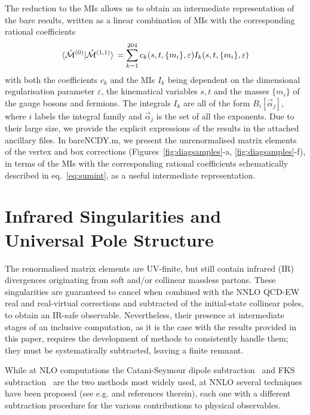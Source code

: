 \documentclass[11pt,a4paper]{article}
\begin{document}
%
The reduction to the MIs allows us to obtain an intermediate representation
of the bare results, written as a linear combination of MIs with the corresponding rational coefficients
\begin{equation}
\langle \hat{\cal M}^{(0)} | \hat{\cal M}^{(1,1)} \rangle \, = \sum_{k=1}^{204} c_k(s,t,\{m_i\},\varepsilon) I_k(s,t,\{m_i\},\varepsilon)
\label{eq:sumint}
\end{equation}
with both the coefficients $c_k$ and the MIs $I_k$ being dependent on the dimensional regularisation parameter $\varepsilon$,
the kinematical variables $s,t$ and the masses $\{m_i\}$ of the gauge bosons and fermions.
The integrals $I_k$ are all of the form $B_i[\vec\alpha_j]$,
where $i$ labels
the integral family and $\vec\alpha_j$ is the set of all the exponents.
%
%
Due to their large size, we provide the explicit expressions of the results in the attached ancillary files.
In \textsf{bareNCDY.m}, we present the unrenormalised matrix elements
of the vertex and box corrections (Figures~\ref{fig:diagsamples}-a, \ref{fig:diagsamples}-f),
in terms of the MIs with the corresponding rational coefficients schematically described in eq.~\eqref{eq:sumint},
as a useful intermediate representation.




\section{Infrared Singularities and Universal Pole Structure}
\label{sec:infra}
%
The renormalised matrix elements are UV-finite,
but still contain infrared (IR) divergences
originating from soft and/or collinear massless partons.
These singularities are guaranteed to cancel
when combined with the NNLO QCD-EW real and real-virtual corrections
and subtracted of the initial-state collinear poles,
to obtain an IR-safe observable.
Nevertheless,
their presence at intermediate stages of an inclusive computation,
as it is the case with the results provided in this paper,
requires the development of methods to consistently handle them;
they must be systematically subtracted, leaving a finite remnant.


While at NLO computations the Catani-Seymour dipole subtraction~\cite{Catani:1996jh,Catani:1996vz,Catani:2002hc} and FKS subtraction~\cite{Frixione:1995ms} are the two methods most widely used, at NNLO several techniques have been proposed (see e.g. \cite{Proceedings:2018jsb} and references therein), each one with a different subtraction procedure for the various contributions to physical observables.
\end{document}

